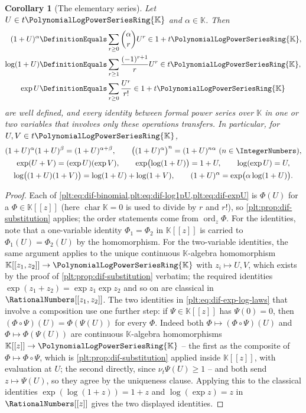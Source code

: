 \documentclass[11pt,oneside]{article}
\theoremstyle{plain}
\newtheorem{corollary}[theorem]{Corollary}
\theoremstyle{definition}
\theoremstyle{remark}
\newcommand{\K}{\mathbb{K}}
\newcommand{\PLpow}{\PolynomialLogPowerSeriesRing{\K}}   %
\newcommand{\ordt}{\nu_{t}}                              %
\begin{document}
\begin{corollary}[The elementary series]\label{plt:cor:dif-elementary}
Let \(U\in t\PLpow\) and \(\alpha\in\K\).  Then
\begin{align}
  (1+U)^{\alpha}&\DefinitionEquals\sum_{r\ge0}\binom{\alpha}{r}U^{r}
   \in1+t\PLpow,
   \label{plt:eq:dif-binomial}\\
  \log(1+U)&\DefinitionEquals\sum_{r\ge1}\frac{(-1)^{r+1}}{r}U^{r}
   \in t\PLpow,
   \label{plt:eq:dif-log1pU}\\
  \exp U&\DefinitionEquals\sum_{r\ge0}\frac{U^{r}}{r!}\in1+t\PLpow
   \label{plt:eq:dif-expU}
\end{align}
are well defined, and every identity between formal power series over \(\K\)
in one or two variables that involves only these operations transfers.  In
particular, for \(U,V\in t\PLpow\),
\begin{gather}
  (1+U)^{\alpha}(1+U)^{\beta}=(1+U)^{\alpha+\beta},\qquad
  \bigl((1+U)^{\alpha}\bigr)^{n}=(1+U)^{n\alpha}\ (n\in\IntegerNumbers),
  \label{plt:eq:dif-power-laws}\\
  \exp(U+V)=(\exp U)(\exp V),\qquad
  \exp\bigl(\log(1+U)\bigr)=1+U,\qquad
  \log(\exp U)=U,
  \label{plt:eq:dif-exp-log-laws}\\
  \log\bigl((1+U)(1+V)\bigr)=\log(1+U)+\log(1+V),\qquad
  (1+U)^{\alpha}=\exp\bigl(\alpha\log(1+U)\bigr).
  \label{plt:eq:dif-log-laws}
\end{gather}
\end{corollary}

\begin{proof}
Each of \cref{plt:eq:dif-binomial,plt:eq:dif-log1pU,plt:eq:dif-expU} is
\(\Phi(U)\) for a \(\Phi\in\K[[z]]\) (here \(\operatorname{char}\K=0\) is used
to divide by \(r\) and \(r!\)), so \cref{plt:prop:dif-substitution} applies;
the order statements come from \(\operatorname{ord}_{z}\Phi\).  For the
identities, note that a one-variable identity \(\Phi_{1}=\Phi_{2}\) in
\(\K[[z]]\) is carried to \(\Phi_{1}(U)=\Phi_{2}(U)\) by the homomorphism.  For
the two-variable identities, the same argument applies to the unique continuous
\(\K\)-algebra homomorphism \(\K[[z_{1},z_{2}]]\to\PLpow\) with
\(z_{i}\mapsto U,V\), which exists by the proof of
\cref{plt:prop:dif-substitution} verbatim; the required identities
\(\exp(z_{1}+z_{2})=\exp z_{1}\exp z_{2}\) and so on are classical in
\(\RationalNumbers[[z_{1},z_{2}]]\).  The two identities in
\cref{plt:eq:dif-exp-log-laws} that involve a composition use one further
step: if \(\Psi\in\K[[z]]\) has \(\Psi(0)=0\), then
\((\Phi\circ\Psi)(U)=\Phi(\Psi(U))\) for every \(\Phi\).  Indeed both
\(\Phi\mapsto(\Phi\circ\Psi)(U)\) and \(\Phi\mapsto\Phi(\Psi(U))\) are
continuous \(\K\)-algebra homomorphisms \(\K[[z]]\to\PLpow\) -- the first as
the composite of \(\Phi\mapsto\Phi\circ\Psi\), which is
\cref{plt:prop:dif-substitution} applied inside \(\K[[z]]\), with evaluation at
\(U\); the second directly, since \(\ordt\Psi(U)\ge1\) -- and both send
\(z\mapsto\Psi(U)\), so they agree by the uniqueness clause.  Applying this to
the classical identities \(\exp(\log(1+z))=1+z\) and \(\log(\exp z)=z\) in
\(\RationalNumbers[[z]]\) gives the two displayed identities.
\end{proof}
\end{document}
